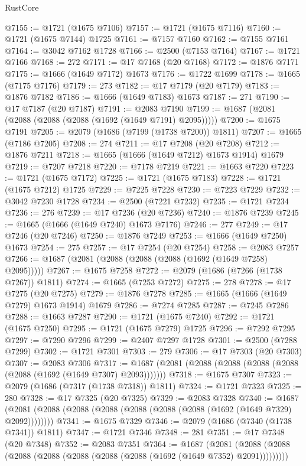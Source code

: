 \begin{lexlean}{RustCore}
\begin{coremodule}
@7155 := @1721 (@1675 @7106)
@7157 := @1721 (@1675 @7116)
@7160 := @1721 (@1675 @7144) @1725
@7161 := @7157 @7160
@7162 := @7155 @7161
@7164 := @3042 @7162 @1728
@7166 := @2500 (@7153 @7164)
@7167 := @1721 @7166
@7168 := 272
@7171 := @17 @7168 (@20 @7168)
@7172 := @1876 @7171
@7175 := @1666 (@1649 @7172) @1673
@7176 := @1722 @1699
@7178 := @1665 (@7175 @7176)
@7179 := 273
@7182 := @17 @7179 (@20 @7179)
@7183 := @1876 @7182
@7186 := @1666 (@1649 @7183) @1673
@7187 := 271
@7190 := @17 @7187 (@20 @7187)
@7191 := @2083 @7190
@7199 := @1687 (@2081 (@2088 (@2088 (@2088 (@1692 (@1649 @7191) @2095)))))
@7200 := @1675 @7191
@7205 := @2079 (@1686 (@7199 (@1738 @7200)) @1811)
@7207 := @1665 (@7186 @7205)
@7208 := 274
@7211 := @17 @7208 (@20 @7208)
@7212 := @1876 @7211
@7218 := @1665 (@1666 (@1649 @7212) @1673 @1914) @1679
@7219 := @7207 @7218
@7220 := @7178 @7219
@7221 := @1663 @7220
@7223 := @1721 (@1675 @7172)
@7225 := @1721 (@1675 @7183)
@7228 := @1721 (@1675 @7212) @1725
@7229 := @7225 @7228
@7230 := @7223 @7229
@7232 := @3042 @7230 @1728
@7234 := @2500 (@7221 @7232)
@7235 := @1721 @7234
@7236 := 276
@7239 := @17 @7236 (@20 @7236)
@7240 := @1876 @7239
@7245 := @1665 (@1666 (@1649 @7240) @1673 @7176)
@7246 := 277
@7249 := @17 @7246 (@20 @7246)
@7250 := @1876 @7249
@7253 := @1666 (@1649 @7250) @1673
@7254 := 275
@7257 := @17 @7254 (@20 @7254)
@7258 := @2083 @7257
@7266 := @1687 (@2081 (@2088 (@2088 (@2088 (@1692 (@1649 @7258) @2095)))))
@7267 := @1675 @7258
@7272 := @2079 (@1686 (@7266 (@1738 @7267)) @1811)
@7274 := @1665 (@7253 @7272)
@7275 := 278
@7278 := @17 @7275 (@20 @7275)
@7279 := @1876 @7278
@7285 := @1665 (@1666 (@1649 @7279) @1673 @1914) @1679
@7286 := @7274 @7285
@7287 := @7245 @7286
@7288 := @1663 @7287
@7290 := @1721 (@1675 @7240)
@7292 := @1721 (@1675 @7250)
@7295 := @1721 (@1675 @7279) @1725
@7296 := @7292 @7295
@7297 := @7290 @7296
@7299 := @2407 @7297 @1728
@7301 := @2500 (@7288 @7299)
@7302 := @1721 @7301
@7303 := 279
@7306 := @17 @7303 (@20 @7303)
@7307 := @2083 @7306
@7317 := @1687 (@2081 (@2088 (@2088 (@2088 (@2088 (@2088 (@1692 (@1649 @7307) @2093)))))))
@7318 := @1675 @7307
@7323 := @2079 (@1686 (@7317 (@1738 @7318)) @1811)
@7324 := @1721 @7323
@7325 := 280
@7328 := @17 @7325 (@20 @7325)
@7329 := @2083 @7328
@7340 := @1687 (@2081 (@2088 (@2088 (@2088 (@2088 (@2088 (@2088 (@1692 (@1649 @7329) @2092))))))))
@7341 := @1675 @7329
@7346 := @2079 (@1686 (@7340 (@1738 @7341)) @1811)
@7347 := @1721 @7346
@7348 := 281
@7351 := @17 @7348 (@20 @7348)
@7352 := @2083 @7351
@7364 := @1687
    (@2081 (@2088 (@2088 (@2088 (@2088 (@2088 (@2088 (@2088 (@1692 (@1649 @7352) @2091)))))))))

\end{coremodule}
\end{lexlean}
